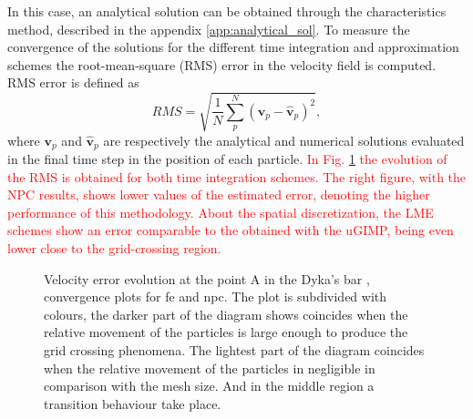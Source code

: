 \documentclass[preprint,12pt,a4paper]{elsarticle}
\newcommand{\vect}[1]{
  \ensuremath{\mathbf{{#1}}}
}
\newcommand{\PNA}[1]{
  \textcolor{red}{{#1}}
}
\begin{document}
In this case, an analytical solution can be obtained
through the characteristics method, described in the appendix
\ref{app:analytical_sol}. To measure the convergence of the solutions
for the different time integration and approximation schemes the
root-mean-square (RMS) error in the velocity field is computed. RMS
error is defined as
\begin{equation}
  \label{eq:RMS}
  RMS = \sqrt{\frac{1}{N} \sum^{N}_p \left( \vect{v}_p - \hat{\vect{v}}_p \right)^2},
\end{equation}
where $\vect{v}_p$ and $\hat{\vect{v}}_p$ are respectively the analytical and
numerical solutions evaluated in the final time step in the position
of each particle.\PNA{In Fig. \ref{fig:Dyka-error-evol} the evolution of the RMS is obtained for both time integration schemes. The right figure, with the \acrshort{NPC} results, shows lower values of the estimated error, denoting the higher performance of this methodology. About the spatial discretization, the \acrshort{LME} schemes show an error comparable to the obtained with the \acrshort{uGIMP}, being even lower close to the grid-crossing region.}

\begin{figure}\sidecaption
  \centering
  \caption{Velocity error evolution at the point A in the Dyka's bar ,
    convergence plots for \acrshort{fe} and \acrshort{npc}. The plot is subdivided with
    colours, the darker part of the diagram shows coincides when the
    relative movement of the particles is large enough to produce the
    grid crossing phenomena. The lightest part of the diagram
    coincides when the relative movement of the particles in
    negligible in comparison with the mesh size. And in the middle
    region a transition behaviour take place.}
  \label{fig:Dyka-error-evol}
\end{figure}
\end{document}
